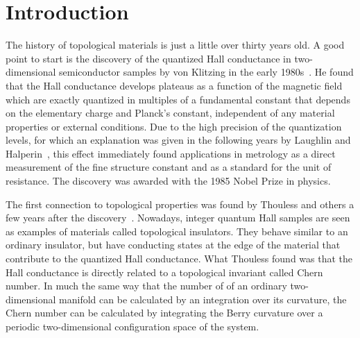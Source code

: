 \chapter*{Introduction}


The history of topological materials is just a little over thirty years old.
A good point to start is the discovery of the quantized Hall conductance in two-dimensional semiconductor samples by von Klitzing in the early 1980s~\cite{Klitzing1980,Klitzing1992}.
He found that the Hall conductance develops plateaus as a function of the magnetic field which are exactly quantized in multiples of a fundamental constant that depends on the elementary charge and Planck's constant, independent of any material properties or external conditions.
Due to the high precision of the quantization levels, for which an explanation was given in the following years by Laughlin and Halperin~\cite{Laughlin1981,Halperin1982}, this effect immediately found applications in metrology as a direct measurement of the fine structure constant and as a standard for the unit of resistance.
The discovery was awarded with the 1985 Nobel Prize in physics.

The first connection to topological properties was found by Thouless and others a few years after the discovery~\cite{Thouless1982,Niu1985,Kohmoto1985,Avron1985,Kohmoto1989,Bellissard1994,Avron2003}.
Nowadays, integer quantum Hall samples are seen as examples of materials called topological insulators. They behave similar to an ordinary insulator, but have conducting states at the edge of the material that contribute to the quantized Hall conductance.
What Thouless found was that the Hall conductance is directly related to a topological invariant called Chern number.
In much the same way that the number of  of an ordinary two-dimensional manifold can be calculated by an integration over its curvature, the Chern number can be calculated by integrating the Berry curvature over a periodic two-dimensional configuration space of the system.

